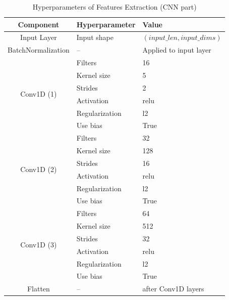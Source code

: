 \documentclass[sigconf,natbib=false]{acmart}
\begin{document}
\begin{table}
  \caption{Hyperparameters of Features Extraction (CNN part)}
  \label{tab:hyperparams_conv}
  \begin{tabular}{cll}
    \toprule
    Component & Hyperparameter & Value \\
    \midrule
    Input Layer & Input shape & $(input\_len, input\_dims)$ \\
    BatchNormalization & -- & Applied to input layer \\
    \multirow{6}{*}{Conv1D (1)} & Filters & 16 \\
                       & Kernel size & 5 \\
                       & Strides & 2 \\
                       & Activation & relu \\
                       & Regularization & l2 \\
                       & Use bias & True \\
    \multirow{6}{*}{Conv1D (2)} & Filters & 32 \\
                          & Kernel size & 128 \\
                          & Strides & 16 \\
                          & Activation & relu \\
                          & Regularization & l2 \\
                          & Use bias & True \\

    \multirow{6}{*}{Conv1D (3)} & Filters & 64 \\
                          & Kernel size & 512 \\
                          & Strides & 32 \\
                          & Activation & relu \\
                          & Regularization & l2 \\
                          & Use bias & True \\
    Flatten & -- & after Conv1D layers \\
    \bottomrule
  \end{tabular}
\end{table}
\end{document}
